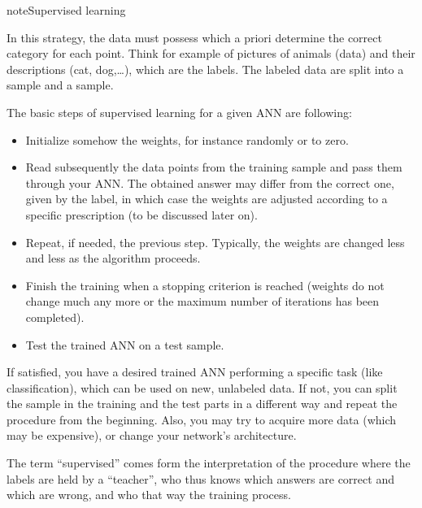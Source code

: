 \documentclass[letterpaper,10pt,english]{jupyterBook}
\begin{document}
\begin{sphinxadmonition}{note}{Supervised learning}

\sphinxAtStartPar
In this strategy, the data must possess  which a priori determine the correct category for each point. Think for example of pictures of animals (data) and their descriptions (cat, dog,…), which are the labels.
The labeled data are split into a  sample and a  sample.

\sphinxAtStartPar
The basic steps of supervised learning for a given ANN are following:
\begin{itemize}
\item {} 
\sphinxAtStartPar
Initialize somehow the weights, for instance randomly or to zero.

\item {} 
\sphinxAtStartPar
Read subsequently the data points from the training sample and pass them through your ANN. The obtained answer may differ from the correct one, given by the label, in which case the weights are adjusted according to a specific prescription (to be discussed later on).

\item {} 
\sphinxAtStartPar
Repeat, if needed, the previous step. Typically, the weights are changed less and less as the algorithm proceeds.

\item {} 
\sphinxAtStartPar
Finish the training when a stopping criterion is reached (weights do not change much any more or the maximum number of iterations has been completed).

\item {} 
\sphinxAtStartPar
Test the trained ANN on a test sample.

\end{itemize}

\sphinxAtStartPar
If satisfied, you have a desired trained ANN performing a specific task (like classification), which can be used on new, unlabeled data. If not, you can split the sample in the training and the test parts in a different way and repeat the procedure from the beginning. Also, you may try to acquire more data (which may be expensive), or change your network’s architecture.

\sphinxAtStartPar
The term “supervised” comes form the interpretation of the procedure where the labels are held by a “teacher”, who thus knows which answers are correct and which are wrong, and who  that way the training process.
\end{sphinxadmonition}
\end{document}
